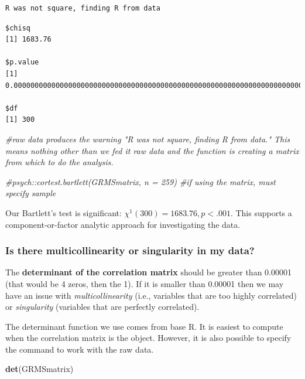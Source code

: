 \documentclass[
  english,
]{book}
\newenvironment{Shaded}{\begin{snugshade}}{\end{snugshade}}
\newcommand{\CommentTok}[1]{\textcolor[rgb]{0.56,0.35,0.01}{\textit{#1}}}
\newcommand{\KeywordTok}[1]{\textcolor[rgb]{0.13,0.29,0.53}{\textbf{#1}}}
\newcommand{\NormalTok}[1]{#1}
\begin{document}
\begin{verbatim}
R was not square, finding R from data
\end{verbatim}

\begin{verbatim}
$chisq
[1] 1683.76

$p.value
[1] 0.00000000000000000000000000000000000000000000000000000000000000000000000000000000000000000000000000000000000000000000000000000000000000000000000000000000000000000000000000000000000000000000005520916

$df
[1] 300
\end{verbatim}

\begin{Shaded}
\begin{Highlighting}[]
\CommentTok{#raw data produces the warning "R was not square, finding R from data." This means nothing other than we fed it raw data and the function is creating a matrix from which to do the analysis.}

\CommentTok{#psych::cortest.bartlett(GRMSmatrix, n = 259) #if using the matrix, must specify sample}
\end{Highlighting}
\end{Shaded}

Our Bartlett's test is significant: \(\chi ^{1}(300)=1683.76, p < .001\). This supports a component-or-factor analytic approach for investigating the data.

\hypertarget{is-there-multicollinearity-or-singularity-in-my-data}{%
\subsubsection{Is there multicollinearity or singularity in my data?}\label{is-there-multicollinearity-or-singularity-in-my-data}}

The \textbf{determinant of the correlation matrix} should be greater than 0.00001 (that would be 4 zeros, then the 1). If it is smaller than 0.00001 then we may have an issue with \emph{multicollinearity} (i.e., variables that are too highly correlated) or \emph{singularity} (variables that are perfectly correlated).

The determinant function we use comes from base R. It is easiest to compute when the correlation matrix is the object. However, it is also possible to specify the command to work with the raw data.

\begin{Shaded}
\begin{Highlighting}[]
\KeywordTok{det}\NormalTok{(GRMSmatrix) }
\end{Highlighting}
\end{Shaded}
\end{document}
